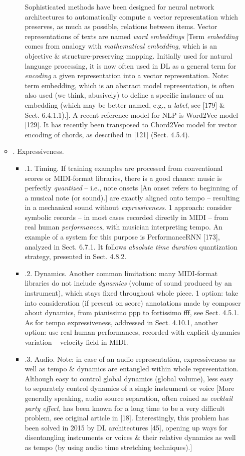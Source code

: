 \documentclass{article}
\begin{document}
\begin{itemize}
\begin{itemize}
\begin{itemize}
			Sophisticated methods have been designed for neural network architectures to automatically compute a vector representation which preserves, as much as possible, relations between items. Vector representations of texts are named {\it word embeddings} [Term {\it embedding} comes from analogy with {\it mathematical embedding}, which is an objective \& structure-preserving mapping. Initially used for natural language processing, it is now often used in DL as a general term for {\it encoding} a given representation into a vector representation. Note: term embedding, which is an abstract model representation, is often also used (we think, abusively) to define a specific instance of an embedding (which may be better named, e.g., a {\it label}, see [179] \& Sect. 6.4.1.1).]. A recent reference model for NLP is Word2Vec model [129]. It has recently been transposed to Chord2Vec model for vector encoding of chords, as described in [121] (Sect. 4.5.4).
		\end{itemize}
		\item {. Expressiveness.}
		\begin{itemize}
			\item {.1. Timing.} If training examples are processed from conventional scores or MIDI-format libraries, there is a good chance: music is perfectly {\it quantized} -- i.e., note onsets [An onset refers to beginning of a musical note (or sound).] are exactly aligned onto tempo -- resulting in a mechanical sound without {\it expressiveness}. 1 approach: consider symbolic records -- in most cases recorded directly in MIDI -- from real human {\it performances}, with musician interpreting tempo. An example of a system for this purpose is PerformanceRNN [173], analyzed in Sect. 6.7.1. It follows {\it absolute time duration} quantization strategy, presented in Sect. 4.8.2.
			\item {.2. Dynamics.} Another common limitation: many MIDI-format libraries do not include {\it dynamics} (volume of sound produced by an instrument), which stays fixed throughout whole piece. 1 option: take into consideration (if present on score) annotations made by composer about dynamics, from pianissimo ppp to fortissimo fff, see Sect. 4.5.1. As for tempo expressiveness, addressed in Sect. 4.10.1, another option: use real human performances, recorded with explicit dynamics variation -- velocity field in MIDI.
			\item {.3. Audio.} Note: in case of an audio representation, expressiveness as well as tempo \& dynamics are entangled within whole representation. Although easy to control global dynamics (global volume), less easy to separately control dynamics of a single instrument or voice [More generally speaking, audio source separation, often coined as {\it cocktail party effect}, has been known for a long time to be a very difficult problem, see original article in [18]. Interestingly, this problem has been solved in 2015 by DL architectures [45], opening up ways for disentangling instruments or voices \& their relative dynamics as well as tempo (by using audio time stretching techniques).]

\end{itemize}
\end{itemize}
\end{itemize}
\end{document}
